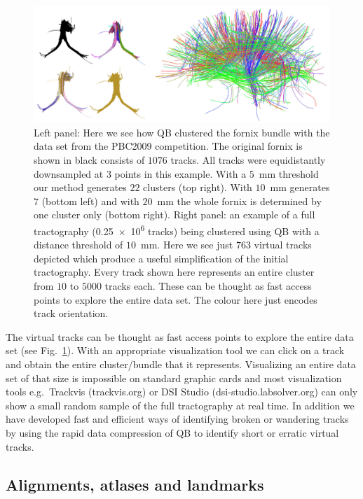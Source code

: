 \documentclass[journal]{IEEEtran}
\begin{document}
\begin{figure}
\begin{centering}
\includegraphics[scale=0.45]{Fig_6_QB_simple}
\par\end{centering}
\caption{Left panel: Here we see how QB clustered the fornix bundle with the
  data set from the PBC2009 competition. The original fornix is shown in
  black consists of $1076$ tracks. All tracks were equidistantly
  downsampled at $3$ points in this example. With a $5$~mm threshold our
  method generates $22$ clusters (top right). With $10$~mm generates $7$
  (bottom left) and with $20$~mm the whole fornix is determined by one
  cluster only (bottom right). Right panel: an example of a full tractography
  (\num{0.25e6} tracks) being clustered using QB with a distance threshold
  of $10$~mm. Here we see just $763$ virtual tracks depicted which
  produce a useful simplification of the initial tractography. Every
  track shown here represents an entire cluster from $10$ to $5000$
  tracks each. These can be thought as fast access points to explore the
  entire data set. The colour here just encodes track
  orientation.\label{Flo:QB_fornix}}
\centering{}
\end{figure}

The virtual tracks can be thought as fast access points to explore the
entire data set (see Fig.~\ref{Flo:QB_fornix}). With an appropriate
visualization tool we can click on a track and obtain the entire
cluster/bundle that it represents. Visualizing an entire data set of
that size is impossible on standard graphic cards and most visualization
tools e.g.~Trackvis (trackvis.org) or DSI Studio
(dsi-studio.labsolver.org) can only show a small random sample of the
full tractography at real time. In addition we have developed fast and
efficient ways of identifying broken or wandering tracks by using the
rapid data compression of QB to identify short or erratic virtual
tracks.

\subsection{Alignments, atlases and landmarks\label{sub:Atlases-made-easy}}
\end{document}
